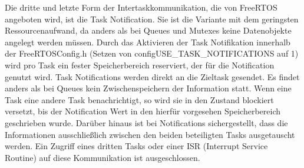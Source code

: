 Die dritte und letzte Form der Intertaskkommunikation, die von FreeRTOS angeboten wird, ist die Task Notification. Sie ist die Variante mit dem geringsten Ressourcenaufwand, da anders als bei Queues und Mutexes keine Datenobjekte angelegt werden müssen. Durch das Aktivieren der Task Notifikation innerhalb der FreeRTOSConfig.h (Setzen von configUSE\_TASK\_NOTIFICATIONS auf 1) wird pro Task ein fester Speicherbereich reserviert, der für die Notification genutzt wird. Task Notifications werden direkt an die Zieltask gesendet. Es findet anders als bei Queues kein Zwischenspeichern der Information statt. Wenn eine Task eine andere Task benachrichtigt, so wird sie in den Zustand blockiert versetzt, bis der Notification Wert in den hierfür vorgesehen Speicherbereich geschrieben wurde. Darüber hinaus ist bei Notifications sichergestellt, dass die Informationen ausschließlich zwischen den beiden beteiligten Tasks ausgetauscht werden. Ein Zugriff eines dritten Tasks oder einer ISR (Interrupt Service Routine) auf diese Kommunikation ist ausgeschlossen.